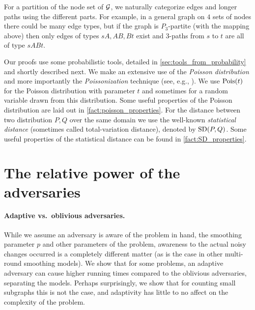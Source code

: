 \documentclass[letter,11pt]{article}
\begin{document}
For a partition of the node set of $\mathcal{G}$, we naturally categorize edges and longer paths using the different parts.
For example, in a general graph on $4$ sets of nodes there could be many edge types, but if the graph is $P_3$-partite (with the mapping above) then only edges of types $sA, AB, Bt$ exist and $3$-paths from $s$ to $t$ are all of type $sABt$.

Our proofs use some probabilistic tools, detailed in \cref{sec:tools_from_probability} and shortly described next.
We make an extensive use of the \emph{Poisson distribution} and more importantly the \emph{Poissonization} technique (see, e.g., \cite[Section~8.4]{books:probability}).
We use $\poisson{t}$ for the Poisson distribution with parameter $t$ and sometimes for a random variable drawn from this distribution.
Some useful properties of the Poisson distribution are laid out in \cref{fact:poisson_properties}.
For the distance between two distribution $P, Q$ over the same domain we use the well-known \emph{statistical distance} (sometimes called total-variation distance), denoted by $\sd PQ$.
Some useful properties of the statistical distance can be found in \cref{fact:SD_properties}.

\section{The relative power of the adversaries}
\label{sec:adver}

\paragraph{Adaptive vs.\ oblivious adversaries.}
While we assume an adversary is aware of the problem in hand, the smoothing parameter $p$ and other parameters of the problem, 
awareness to the actual noisy changes occurred is a completely different matter
(as is the case in other multi-round smoothing models). 
We show that for some problems, an adaptive adversary can cause higher running times compared to the oblivious adversaries, separating the models. 
Perhaps surprisingly, we show that for counting small subgraphs this is not the case, and adaptivity has little to no affect on the complexity of the problem.
\end{document}
